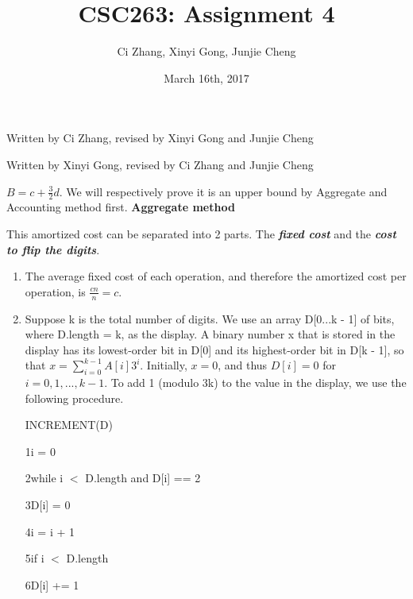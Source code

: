 \documentclass[11pt, answers]{exam}
\theoremstyle{plain}
\theoremstyle{definition}
\begin{document}
 


\title{CSC263: Assignment 4}
\date{March 16th, 2017}
\author{Ci Zhang, Xinyi Gong, Junjie Cheng}
\maketitle

\unframedsolutions

\begin{questions}
\question
\begin{solution}Written by Ci Zhang, revised by Xinyi Gong and Junjie Cheng


\end{solution}

\question
\begin{solution}Written by Xinyi Gong, revised by Ci Zhang and Junjie Cheng

$B = c + {\frac{3}{2}}d$. \newline
We will respectively prove it is an upper bound by Aggregate and Accounting method first.\newline
\newline
\textbf{Aggregate method}

This amortized cost can be separated into 2 parts. The \textbf{\emph{fixed cost}} and the \textbf{\emph{cost to flip the digits}}.

\begin{enumerate}

\item
The average fixed cost of each operation, and therefore the amortized cost per operation, is $\frac{cn}{n} = c$.
\item
Suppose k is the total number of digits. 
We use an array D[0...k - 1] of bits, where D.length = k, as the display. A binary number x that is stored in the display has its lowest-order bit in D[0] and its highest-order bit in D[k - 1], so that $x = \sum_{i=0}^{k-1} A[i]3^i$. Initially, $x = 0$, and thus $D[i] = 0$ for $i = 0, 1,..., k - 1$. To add 1 (modulo 3k) to the value in the display, we use the following procedure.

INCREMENT(D)

1\qquad i = 0

2\qquad while i $<$ D.length and D[i] == 2

3\qquad\qquad D[i] = 0

4\qquad\qquad i = i + 1

5\qquad if i $<$ D.length

6\qquad\qquad D[i] += 1


\end{enumerate}
\end{solution}
\end{questions}
\end{document}
